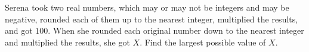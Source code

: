 Serena took two real numbers, which may or may not be integers and may be negative, rounded each of them up to the nearest integer, multiplied the results, and got $100$. When she rounded each original number down to the nearest integer and multiplied the results, she got $X$. Find the largest possible value of $X$.
